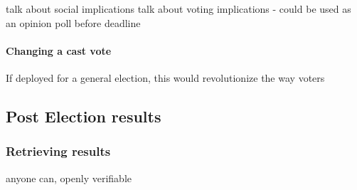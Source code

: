 \documentclass{article}
\begin{document}
talk about social implications
talk about voting implications - could be used as an opinion poll before deadline


\paragraph{Changing a cast vote}
\hfill \break
 If deployed for a general election, this would revolutionize the way voters 


\cleardoublepage
\subsection{Post Election results}
\subsubsection{Retrieving results}
anyone can, openly verifiable


\end{document}
